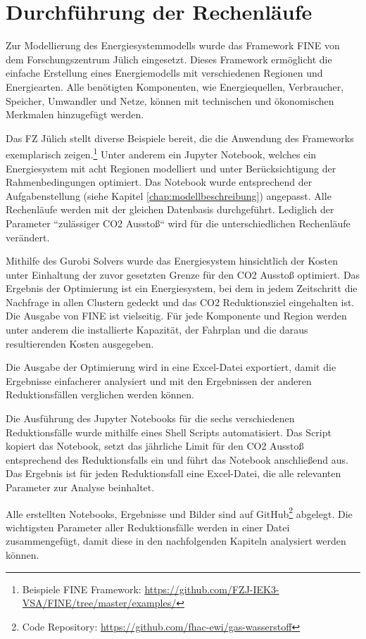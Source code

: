 \section{Durchführung der Rechenläufe}
Zur Modellierung des Energiesystemmodells wurde das Framework FINE von dem Forschungszentrum Jülich eingesetzt.
Dieses Framework ermöglicht die einfache Erstellung eines Energiemodells mit verschiedenen Regionen und Energiearten. Alle benötigten Komponenten, wie Energiequellen, Verbraucher, Speicher, Umwandler und Netze, können mit technischen und ökonomischen Merkmalen hinzugefügt werden. 

Das FZ Jülich stellt diverse Beispiele bereit, die die Anwendung des Frameworks exemplarisch zeigen.\footnote{Beispiele FINE Framework: \url{https://github.com/FZJ-IEK3-VSA/FINE/tree/master/examples/}} Unter anderem ein Jupyter Notebook, welches ein Energiesystem mit acht Regionen modelliert und unter Berücksichtigung der Rahmenbedingungen optimiert. Das Notebook wurde entsprechend der Aufgabenstellung (siehe Kapitel \ref{chap:modellbeschreibung}) angepasst. Alle Rechenläufe werden mit der gleichen Datenbasis durchgeführt. Lediglich der Parameter ``zulässiger CO2 Ausstoß`` wird für die unterschiedlichen Rechenläufe verändert. 

Mithilfe des Gurobi Solvers wurde das Energiesystem hinsichtlich der Kosten unter Einhaltung der zuvor gesetzten Grenze für den CO2 Ausstoß optimiert. Das Ergebnis der Optimierung ist ein Energiesystem, bei dem in jedem Zeitschritt die Nachfrage in allen Clustern gedeckt und das CO2 Reduktionsziel eingehalten ist. Die Ausgabe von FINE ist vielseitig. Für jede Komponente und Region werden unter anderem die installierte Kapazität, der Fahrplan und die daraus resultierenden Kosten ausgegeben.

Die Ausgabe der Optimierung wird in eine Excel-Datei exportiert, damit die Ergebnisse einfacherer analysiert und mit den Ergebnissen der anderen Reduktionsfällen verglichen werden können. 

Die Ausführung des Jupyter Notebooks für die sechs verschiedenen Reduktionsfälle wurde mithilfe eines Shell Scripts automatisiert. Das Script kopiert das Notebook, setzt das jährliche Limit für den CO2 Ausstoß entsprechend des Reduktionsfalls ein und führt das Notebook anschließend aus. Das Ergebnis ist für jeden Reduktionsfall eine Excel-Datei, die alle relevanten Parameter zur Analyse beinhaltet.

Alle erstellten Notebooks, Ergebnisse und Bilder sind auf GitHub\footnote{Code Repository: \url{https://github.com/fhac-ewi/gas-wasserstoff}} abgelegt.  
Die wichtigsten Parameter aller Reduktionsfälle werden in einer Datei zusammengefügt, damit diese in den nachfolgenden Kapiteln analysiert werden können. 
